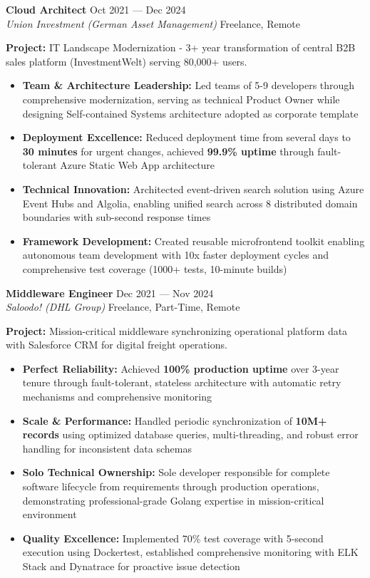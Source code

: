 \documentclass[11pt,a4paper]{article}
\newcommand{\jobtitle}[4]{%
  \vspace{4pt}
  {\bfseries #1} \hfill {\color{lightgray}\small #2}\\
  {\itshape #3} \hfill {\color{lightgray}\small #4}
  \vspace{2pt}
}
\begin{document}
\vspace{6pt}

\jobtitle{Cloud Architect}{Oct 2021 --- Dec 2024}{Union Investment (German Asset Management)}{Freelance, Remote}

\textbf{Project:} IT Landscape Modernization - 3+ year transformation of central B2B sales platform (InvestmentWelt) serving 80,000+ users.

\begin{itemize}
\item \textbf{Team \& Architecture Leadership:} Led teams of 5-9 developers through comprehensive modernization, serving as technical Product Owner while designing Self-contained Systems architecture adopted as corporate template
\item \textbf{Deployment Excellence:} Reduced deployment time from several days to \textbf{30 minutes} for urgent changes, achieved \textbf{99.9\% uptime} through fault-tolerant Azure Static Web App architecture
\item \textbf{Technical Innovation:} Architected event-driven search solution using Azure Event Hubs and Algolia, enabling unified search across 8 distributed domain boundaries with sub-second response times
\item \textbf{Framework Development:} Created reusable microfrontend toolkit enabling autonomous team development with 10x faster deployment cycles and comprehensive test coverage (1000+ tests, 10-minute builds)
\end{itemize}

\vspace{6pt}

\jobtitle{Middleware Engineer}{Dec 2021 --- Nov 2024}{Saloodo! (DHL Group)}{Freelance, Part-Time, Remote}

\textbf{Project:} Mission-critical middleware synchronizing operational platform data with Salesforce CRM for digital freight operations.

\begin{itemize}
\item \textbf{Perfect Reliability:} Achieved \textbf{100\% production uptime} over 3-year tenure through fault-tolerant, stateless architecture with automatic retry mechanisms and comprehensive monitoring
\item \textbf{Scale \& Performance:} Handled periodic synchronization of \textbf{10M+ records} using optimized database queries, multi-threading, and robust error handling for inconsistent data schemas
\item \textbf{Solo Technical Ownership:} Sole developer responsible for complete software lifecycle from requirements through production operations, demonstrating professional-grade Golang expertise in mission-critical environment
\item \textbf{Quality Excellence:} Implemented 70\% test coverage with 5-second execution using Dockertest, established comprehensive monitoring with ELK Stack and Dynatrace for proactive issue detection
\end{itemize}
\end{document}
